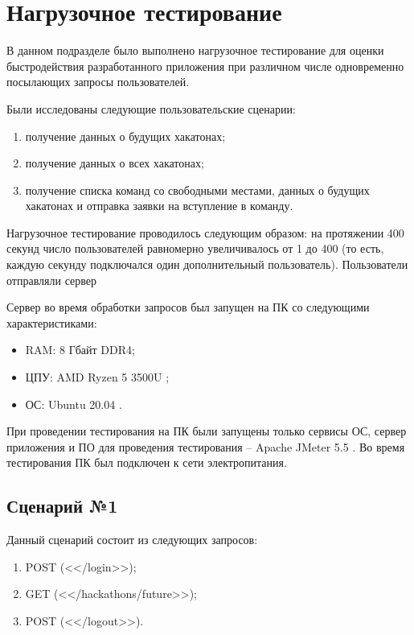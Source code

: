 \section{Нагрузочное тестирование}
В данном подразделе было выполнено нагрузочное тестирование для оценки быстродействия разработанного приложения при различном числе одновременно посылающих запросы пользователей.


Были исследованы следующие пользовательские сценарии:
\begin{enumerate}[label={\arabic*)}]
    \item получение данных о будущих хакатонах;
    \item получение данных о всех хакатонах;
    \item получение списка команд со свободными местами, данных о будущих хакатонах и отправка заявки на вступление в команду.
\end{enumerate}

Нагрузочное тестирование проводилось следующим образом: на протяжении 400 секунд число пользователей равномерно увеличивалось от 1 до 400 (то есть, каждую секунду подключался один дополнительный пользователь). Пользователи отправляли сервер

Сервер во время обработки запросов был запущен на ПК со следующими характеристиками:
\begin{itemize}
    \item RAM: 8 Гбайт DDR4;
    \item ЦПУ: AMD Ryzen 5 3500U \cite{amd};
    \item ОС: Ubuntu 20.04 \cite{ubuntu}.
    \end{itemize}

При проведении тестирования на ПК были запущены только сервисы ОС, сервер приложения и ПО для проведения тестирования -- Apache JMeter 5.5 \cite{jmeter}. Во время тестирования ПК был подключен к сети электропитания.


\subsection{Сценарий №1}

Данный сценарий состоит из следующих запросов:

\begin{enumerate}[label={\arabic*)}]
    \item POST (<</login>>);
    \item GET (<</hackathons/future>>);
    \item POST (<</logout>>).
\end{enumerate}

